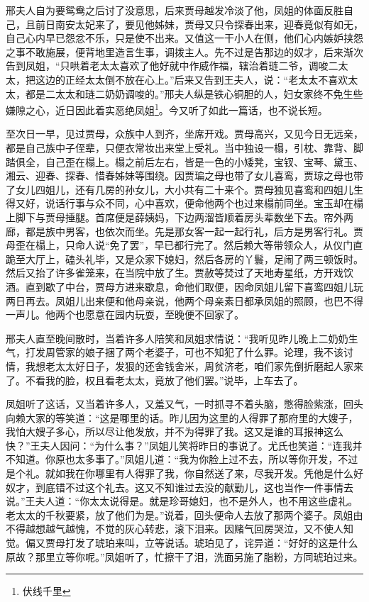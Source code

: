 \documentclass[12pt,oneside]{book}
\begin{document}
邢夫人自为要鸳鸯之后讨了没意思，后来贾母越发冷淡了他，凤姐的体面反胜自己，且前日南安太妃来了，要见他姊妹，贾母又只令探春出来，迎春竟似有如无，自己心内早已怨忿不乐，只是使不出来。又值这一干小人在侧，他们心内嫉妒挟怨之事不敢施展，便背地里造言生事，调拨主人。先不过是告那边的奴才，后来渐次告到凤姐，“只哄着老太太喜欢了他好就中作威作福，辖治着琏二爷，调唆二太太，把这边的正经太太倒不放在心上。”后来又告到王夫人，说：“老太太不喜欢太太，都是二太太和琏二奶奶调唆的。”邢夫人纵是铁心铜胆的人，妇女家终不免生些嫌隙之心，近日因此着实恶绝凤姐\footnote{伏线千里}。今又听了如此一篇话，也不说长短。

至次日一早，见过贾母，众族中人到齐，坐席开戏。贾母高兴，又见今日无远亲，都是自己族中子侄辈，只便衣常妆出来堂上受礼。当中独设一榻，引枕、靠背、脚踏俱全，自己歪在榻上。榻之前后左右，皆是一色的小矮凳，宝钗、宝琴、黛玉、湘云、迎春、探春、惜春姊妹等围绕。因贾㻞之母也带了女儿喜鸾，贾琼之母也带了女儿四姐儿，还有几房的孙女儿，大小共有二十来个。贾母独见喜鸾和四姐儿生得又好，说话行事与众不同，心中喜欢，便命他两个也过来榻前同坐。宝玉却在榻上脚下与贾母捶腿。首席便是薛姨妈，下边两溜皆顺着房头辈数坐下去。帘外两廊，都是族中男客，也依次而坐。先是那女客一起一起行礼，后方是男客行礼。贾母歪在榻上，只命人说“免了罢”，早已都行完了。然后赖大等带领众人，从仪门直跪至大厅上，磕头礼毕，又是众家下媳妇，然后各房的丫鬟，足闹了两三顿饭时。然后又抬了许多雀笼来，在当院中放了生。贾赦等焚过了天地寿星纸，方开戏饮酒。直到歇了中台，贾母方进来歇息，命他们取便，因命凤姐儿留下喜鸾四姐儿玩两日再去。凤姐儿出来便和他母亲说，他两个母亲素日都承凤姐的照顾，也巴不得一声儿。他两个也愿意在园内玩耍，至晚便不回家了。

邢夫人直至晚间散时，当着许多人陪笑和凤姐求情说：“我听见昨儿晚上二奶奶生气，打发周管家的娘子捆了两个老婆子，可也不知犯了什么罪。论理，我不该讨情，我想老太太好日子，发狠的还舍钱舍米，周贫济老，咱们家先倒折磨起人家来了。不看我的脸，权且看老太太，竟放了他们罢。”说毕，上车去了。

凤姐听了这话，又当着许多人，又羞又气，一时抓寻不着头脑，憋得脸紫涨，回头向赖大家的等笑道：“这是哪里的话。昨儿因为这里的人得罪了那府里的大嫂子，我怕大嫂子多心，所以尽让他发放，并不为得罪了我。这又是谁的耳报神这么快？”王夫人因问：“为什么事？”凤姐儿笑将昨日的事说了。尤氏也笑道：“连我并不知道。你原也太多事了。”凤姐儿道：“我为你脸上过不去，所以等你开发，不过是个礼。就如我在你哪里有人得罪了我，你自然送了来，尽我开发。凭他是什么好奴才，到底错不过这个礼去。这又不知谁过去没的献勤儿，这也当作一件事情去说。”王夫人道：“你太太说得是。就是珍哥媳妇，也不是外人，也不用这些虚礼。老太太的千秋要紧，放了他们为是。”说着，回头便命人去放了那两个婆子。凤姐由不得越想越气越愧，不觉的灰心转悲，滚下泪来。因赌气回房哭泣，又不使人知觉。偏又贾母打发了琥珀来叫，立等说话。琥珀见了，诧异道：“好好的这是什么原故？那里立等你呢。”凤姐听了，忙擦干了泪，洗面另施了脂粉，方同琥珀过来。
\end{document}
